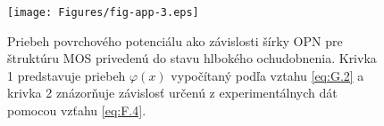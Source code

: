 \begin{figure}[h!]\centering
\texttt{[image: Figures/fig-app-3.eps]}
\captionsetup{justification=raggedright, singlelinecheck=false}
\caption[Priebeh povrchového potenciálu ako závislosti šírky OPN pre
  štruktúru MOS privedenú do stavu hlbokého ochudobnenia]{Priebeh
  povrchového potenciálu ako závislosti šírky OPN pre štruktúru MOS
  privedenú do stavu hlbokého ochudobnenia.  Krivka 1 predstavuje
  priebeh $\varphi(x)$ vypočítaný podľa vztahu \ref{eq:G.2} a krivka 2
  znázorňuje závislosť určenú z experimentálnych dát pomocou vzťahu
  \ref{eq:F.4}.}
\label{fig:App.3}
\end{figure}
